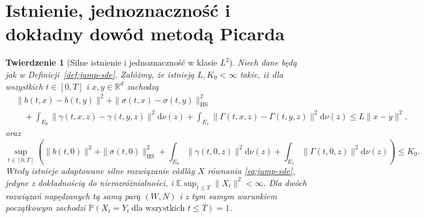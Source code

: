 \documentclass[11pt,a4paper,oneside]{report}
\numberwithin{equation}{chapter}
\theoremstyle{plain}
\newtheorem{twierdzenie}{Twierdzenie}[chapter]
\theoremstyle{definition}
\theoremstyle{remark}
\newcommand{\R}{\mathbb{R}}
\newcommand{\Prob}{\mathbb{P}}
\newcommand{\E}{\mathbb{E}}
\newcommand{\dd}{\mathrm{d}}
\begin{document}
\section{Istnienie, jednoznaczność i dokładny dowód metodą Picarda}\label{sec:volIII:13:03}

\begin{twierdzenie}[Silne istnienie i jednoznaczność w klasie $L^2$]\label{thm:volIII:13:01}
\label{th:jump-picard}
Niech dane będą jak w Definicji~\ref{def:jump-sde}.
Załóżmy, że istnieją $L,K_0<\infty$ takie, iż dla wszystkich
$t\in[0,T]$ i $x,y\in\R^d$ zachodzą
\[
\begin{split}
&\|b(t,x)-b(t,y)\|^2+
 \|\sigma(t,x)-\sigma(t,y)\|_{\mathrm{HS}}^2\\
&\quad+\int_{E_0}\|\gamma(t,x,z)-\gamma(t,y,z)\|^2\dd\nu(z)
 +\int_{E_1}\|\Gamma(t,x,z)-\Gamma(t,y,z)\|^2\dd\nu(z)
 \le L\|x-y\|^2,
\end{split}
\tag{13.3}\label{eq:jump-lip}
\]
oraz
\[
\sup_{t\in[0,T]}\left(
\|b(t,0)\|^2+\|\sigma(t,0)\|_{\mathrm{HS}}^2
+\int_{E_0}\|\gamma(t,0,z)\|^2\dd\nu(z)
+\int_{E_1}\|\Gamma(t,0,z)\|^2\dd\nu(z)
\right)\le K_0.
\tag{13.4}\label{eq:jump-at-zero}
\]
Wtedy istnieje adaptowane silne rozwiązanie càdlàg $X$
równania \eqref{eq:jump-sde}, jedyne z dokładnością
do nierozróżnialności, i
$\E\sup_{t\le T}\|X_t\|^2<\infty$.
Dla dwóch rozwiązań napędzanych tą samą parą $(W,N)$
i z tym samym warunkiem początkowym zachodzi
$\Prob(X_t=Y_t\ \text{dla wszystkich }t\le T)=1$.
\end{twierdzenie}
\end{document}
